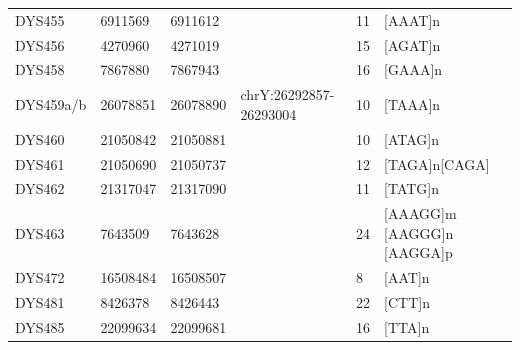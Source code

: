 \begin{tabularx}{\linewidth}{l l l l l l }
DYS455      & 6911569  & 6911612  &                        & 11 & {[}AAAT{]}n                                                                                                                          \\
DYS456      & 4270960  & 4271019  &                        & 15 & {[}AGAT{]}n                                                                                                                          \\
DYS458      & 7867880  & 7867943  &                        & 16 & {[}GAAA{]}n                                                                                                                          \\
DYS459a/b   & 26078851 & 26078890 & chrY:26292857-26293004 & 10 & {[}TAAA{]}n                                                                                                                          \\
DYS460      & 21050842 & 21050881 &                        & 10 & {[}ATAG{]}n                                                                                                                          \\
DYS461      & 21050690 & 21050737 &                        & 12 & {[}TAGA{]}n{[}CAGA{]}                                                                                                                \\
DYS462      & 21317047 & 21317090 &                        & 11 & {[}TATG{]}n                                                                                                                          \\
DYS463      & 7643509  & 7643628  &                        & 24 & {[}AAAGG{]}m {[}AAGGG{]}n {[}AAGGA{]}p                                                                                               \\
DYS472      & 16508484 & 16508507 &                        & 8  & {[}AAT{]}n                                                                                                                           \\
DYS481      & 8426378  & 8426443  &                        & 22 & {[}CTT{]}n                                                                                                                           \\
DYS485      & 22099634 & 22099681 &                        & 16 & {[}TTA{]}n                                                                                                                           \\

\end{tabularx}
